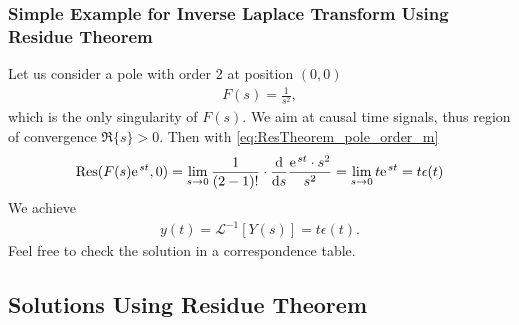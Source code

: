\documentclass[11pt,a4paper,DIV=12]{scrartcl}
\begin{document}
\subsubsection{Simple Example for Inverse Laplace Transform Using Residue Theorem}
Let us consider a pole with order 2 at position $(0,0)$
\begin{align}
	F(s)=\frac{1}{s^2},
\end{align}
which is the only singularity of $F(s)$.
%
We aim at causal time signals, thus region of convergence $\Re\{s\} > 0$.
%
Then with \eqref{eq:ResTheorem_pole_order_m}
\begin{align}
	\mathrm{Res}(F(s)\e^{st},0)=\lim\limits_{s\rightarrow0}\frac{1}{(2-1)!}\cdot\frac{\mathrm{d}}{\mathrm{d}s}\frac{\e^{st}\cdot s^2}{s^2}=\lim\limits_{s\rightarrow0}t\e^{st}=t \epsilon(t)
\end{align}
We achieve
\begin{align}
	y(t)=\mathcal{L}^{-1}[Y(s)]=t \epsilon(t).
\end{align}
Feel free to check the solution in a correspondence table.
\pagebreak
\subsection{Solutions Using Residue Theorem}
\label{sec:ResidueTheorem}
\end{document}
